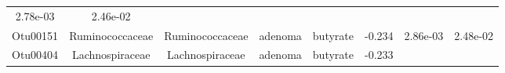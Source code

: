 \documentclass[11pt,]{article}
\begin{document}
\begin{longtable}[]{@{}cccccccc@{}}
\begin{minipage}[t]{0.08\columnwidth}
2.78e-03\strut
\end{minipage} & \begin{minipage}[t]{0.08\columnwidth}\centering\strut
2.46e-02\strut
\end{minipage}\tabularnewline
\begin{minipage}[t]{0.08\columnwidth}\centering\strut
Otu00151\strut
\end{minipage} & \begin{minipage}[t]{0.15\columnwidth}\centering\strut
Ruminococcaceae\strut
\end{minipage} & \begin{minipage}[t]{0.15\columnwidth}\centering\strut
Ruminococcaceae\strut
\end{minipage} & \begin{minipage}[t]{0.08\columnwidth}\centering\strut
adenoma\strut
\end{minipage} & \begin{minipage}[t]{0.09\columnwidth}\centering\strut
butyrate\strut
\end{minipage} & \begin{minipage}[t]{0.07\columnwidth}\centering\strut
-0.234\strut
\end{minipage} & \begin{minipage}[t]{0.08\columnwidth}\centering\strut
2.86e-03\strut
\end{minipage} & \begin{minipage}[t]{0.08\columnwidth}\centering\strut
2.48e-02\strut
\end{minipage}\tabularnewline
\begin{minipage}[t]{0.08\columnwidth}\centering\strut
Otu00404\strut
\end{minipage} & \begin{minipage}[t]{0.15\columnwidth}\centering\strut
Lachnospiraceae\strut
\end{minipage} & \begin{minipage}[t]{0.15\columnwidth}\centering\strut
Lachnospiraceae\strut
\end{minipage} & \begin{minipage}[t]{0.08\columnwidth}\centering\strut
adenoma\strut
\end{minipage} & \begin{minipage}[t]{0.09\columnwidth}\centering\strut
butyrate\strut
\end{minipage} & \begin{minipage}[t]{0.07\columnwidth}\centering\strut
-0.233\strut
\end{minipage} & \begin{minipage}[t]{0.08\columnwidth}\centering\strut

\end{minipage}
\end{longtable}
\end{document}
